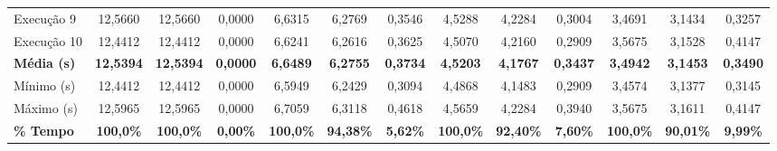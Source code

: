 \documentclass[12pt, a4paper, twoside, chapter=TITLE, subsection=TITLE, section=TITLE, subsubsection=TITLE, english, brazil]{abntex2}
\begin{document}
\begin{table}[htbp]
{\begin{tabular}{lcccccccccccc}
Execução 9 & 12,5660 & 12,5660 & 0,0000 & 6,6315 & 6,2769 & 0,3546 & 4,5288 & 4,2284 & 0,3004 & 3,4691 & 3,1434 & 0,3257 \\
Execução 10 & 12,4412 & 12,4412 & 0,0000 & 6,6241 & 6,2616 & 0,3625 & 4,5070 & 4,2160 & 0,2909 & 3,5675 & 3,1528 & 0,4147 \\
\midrule
\textbf{Média (s)} & \textbf{12,5394} & \textbf{12,5394} & \textbf{0,0000} & \textbf{6,6489} & \textbf{6,2755} & \textbf{0,3734} & \textbf{4,5203} & \textbf{4,1767} & \textbf{0,3437} & \textbf{3,4942} & \textbf{3,1453} & \textbf{0,3490} \\
Mínimo (s) & 12,4412 & 12,4412 & 0,0000 & 6,5949 & 6,2429 & 0,3094 & 4,4868 & 4,1483 & 0,2909 & 3,4574 & 3,1377 & 0,3145 \\
Máximo (s) & 12,5965 & 12,5965 & 0,0000 & 6,7059 & 6,3118 & 0,4618 & 4,5659 & 4,2284 & 0,3940 & 3,5675 & 3,1611 & 0,4147 \\
\textbf{\% Tempo} & \textbf{100,0\%} & \textbf{100,0\%} & \textbf{0,00\%} & \textbf{100,0\%} & \textbf{94,38\%} & \textbf{5,62\%} & \textbf{100,0\%} & \textbf{92,40\%} & \textbf{7,60\%} & \textbf{100,0\%} & \textbf{90,01\%} & \textbf{9,99\%} \\
\bottomrule
\end{tabular}%
}
\end{table}
\end{document}
